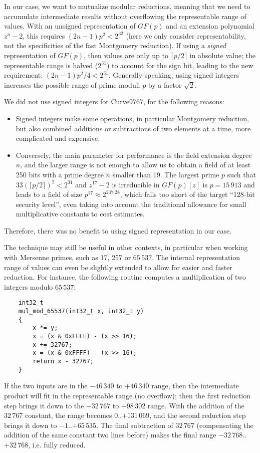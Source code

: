 \documentclass{llncs}
\newcommand{\GF}{GF}
\begin{document}
In our case, we want to mutualize modular reductions, meaning that we
need to accumulate intermediate results without overflowing the
representable range of values. With an unsigned representation of
$\GF(p)$ and an extension polynomial $z^n-2$, this requires $(2n-1)p^2 <
2^{32}$ (here we only consider representability, not the specificities
of the fast Montgomery reduction). If using a \emph{signed}
representation of $\GF(p)$, then values are only up to $\lceil
p/2\rceil$ in absolute value; the representable range is halved
($2^{31}$) to account for the sign bit, leading to the new requirement:
$(2n-1)p^2/4 < 2^{31}$. Generally speaking, using signed integers
increases the possible range of prime moduli $p$ by a factor $\sqrt{2}$.

We did not use signed integers for Curve9767, for the following reasons:
\begin{itemize}

    \item Signed integers make some operations, in particular Montgomery
    reduction, but also combined additions or subtractions of two
    elements at a time, more complicated and expensive.

    \item Conversely, the main parameter for performance is the field
    extension degree $n$, and the larger range is not enough to allow us
    to obtain a field of at least 250 bits with a prime degree $n$
    smaller than 19. The largest prime $p$ such that $33(\lceil
    p/2\rceil)^2 < 2^{31}$ and $z^{17}-2$ is irreducible in $\GF(p)[z]$
    is $p = 15\,913$ and leads to a field of size $p^{17} \approx
    2^{237.28}$, which falls too short of the target ``128-bit security
    level'', even taking into account the traditional allowance for
    small multiplicative constants to cost estimates.

\end{itemize}
Therefore, there was no benefit to using signed representation in our case.

The technique may still be useful in other contexts, in particular when
working with Mersenne primes, such as 17, 257 or $65\,537$. The internal
representation range of values can even be slightly extended to allow
for easier and faster reduction. For instance, the following routine
computes a multiplication of two integers modulo $65\,537$:
\begin{verbatim}
    int32_t
    mul_mod_65537(int32_t x, int32_t y)
    {
        x *= y;
        x = (x & 0xFFFF) - (x >> 16);
        x += 32767;
        x = (x & 0xFFFF) - (x >> 16);
        return x - 32767;
    }
\end{verbatim}
If the two inputs are in the $-46\,340$ to $+46\,340$ range, then the
intermediate product will fit in the representable range (no overflow);
then the first reduction step brings it down to the $-32\,767$ to
$+98\,302$ range. With the addition of the $32\,767$ constant, the range
becomes $0$..$+131\,069$, and the second reduction step brings it down
to $-1$..$+65\,535$. The final subtraction of $32\,767$ (compensating
the addition of the same constant two lines before) makes the final
range $-32\,768$..$+32\,768$, i.e. fully reduced.
\end{document}
